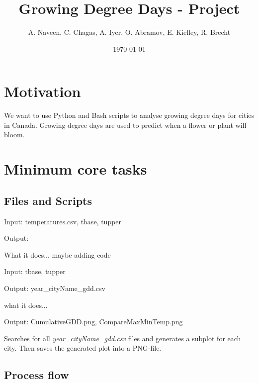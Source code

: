 \documentclass[12pt]{article}
\title{Growing Degree Days - Project}
\author{A. Naveen, C. Chagas, A. Iyer, O. Abramov, E. Kielley, R. Brecht}
\date{\today}
\begin{document}
\maketitle
\vspace{5pt}
\tableofcontents
\vspace{40pt}

\section{Motivation}
We want to use Python and Bash scripts to analyse growing degree days for cities
in Canada. Growing degree days are used to predict when a flower or plant will 
bloom. 

\pagebreak
\section{Minimum core tasks}

\subsection{Files and Scripts}
\begin{description}
\item[gdd.sh]
\item Input: temperatures.csv, tbase, tupper
\item Output:
\item What it does... maybe adding code

\item[gdd.py]
\item Input: tbase, tupper
\item Output: year\_cityName\_gdd.csv
\item what it does...


\item[create\_plots.py]
\item Output: CumulativeGDD.png, CompareMaxMinTemp.png
\item Searches for all \emph{year\_cityName\_gdd.csv} files and generates a subplot for
each city. Then saves the generated plot into a PNG-file.
\end{description}
\subsection{Process flow}
\end{document}
